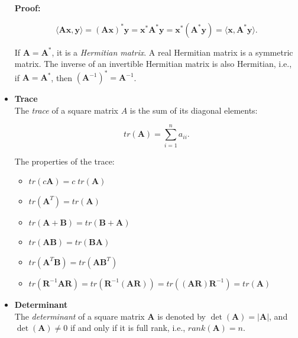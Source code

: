 \documentclass[10pt,b5paper,titlepage]{book}
\begin{document}
\begin{itemize}
        \textbf{Proof:}

        \begin{equation}
            \langle \mathbf{A}\mathbf{x}, \mathbf{y} \rangle
            = (\mathbf{A}\mathbf{x})^{*}\mathbf{y}
            = \mathbf{x}^{*}\mathbf{A}^{*}\mathbf{y}
            = \mathbf{x}^{*}(\mathbf{A}^{*}\mathbf{y})
            = \langle \mathbf{x}, \mathbf{A}^{*}\mathbf{y} \rangle
        .\end{equation}

        If $\mathbf{A} = \mathbf{A}^{*}$, it is a \textit{Hermitian matrix}.
        A real Hermitian matrix is a symmetric matrix. The inverse of an invertible
        Hermitian matrix is also Hermitian, i.e., if $\mathbf{A} = \mathbf{A}^{*}$,
        then $(\mathbf{A}^{-1})^{*} = \mathbf{A}^{-1}$.

    \item \textbf{Trace}\\

        The \textit{trace} of a square matrix $A$ is the sum of its diagonal elements:

        \begin{equation}
            tr(\mathbf{A}) = \sum_{i=1}^{n} a_{ii}
        .\end{equation}

        The properties of the trace:

        \begin{itemize}
            \item $tr(c \mathbf{A}) = c \; tr(\mathbf{A})$
            \item $tr(\mathbf{A}^{T}) = tr(\mathbf{A})$
            \item $tr(\mathbf{A} + \mathbf{B}) = tr(\mathbf{B} + \mathbf{A})$
            \item $tr(\mathbf{A} \mathbf{B}) = tr(\mathbf{B} \mathbf{A})$
            \item $tr(\mathbf{A}^{T} \mathbf{B}) = tr(\mathbf{A} \mathbf{B}^{T})$
            \item $tr(\mathbf{R}^{-1} \mathbf{A} \mathbf{R})
                = tr(\mathbf{R}^{-1}(\mathbf{A} \mathbf{R}))
                = tr((\mathbf{A} \mathbf{R}) \mathbf{R}^{-1})
                = tr(\mathbf{A})$
        \end{itemize}

    \item \textbf{Determinant}\\

        The \textit{determinant} of a square matrix $\mathbf{A}$ is denoted by
        $\det(\mathbf{A}) = |\mathbf{A}|$, and $\det(\mathbf{A}) \neq 0$ if and
        only if it is full rank, i.e., $rank(\mathbf{A}) = n$.\\


\end{itemize}
\end{document}
